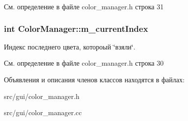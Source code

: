 См. определение в файле color\+\_\+manager.\+h строка 31

\subsubsection[{\texorpdfstring{m\+\_\+current\+Index}{m_currentIndex}}]{\setlength{\rightskip}{0pt plus 5cm}int Color\+Manager\+::m\+\_\+current\+Index\hspace{0.3cm}{\ttfamily [private]}}\hypertarget{class_color_manager_a7b6e45b4281881b4cf37a40dafd1a77a}{}\label{class_color_manager_a7b6e45b4281881b4cf37a40dafd1a77a}
Индекс последнего цвета, котороый \char`\"{}взяли\char`\"{}. 

См. определение в файле color\+\_\+manager.\+h строка 30



Объявления и описания членов классов находятся в файлах\+:\begin{DoxyCompactItemize}
\item 
src/gui/color\+\_\+manager.\+h\item 
src/gui/color\+\_\+manager.\+cc\end{DoxyCompactItemize}
